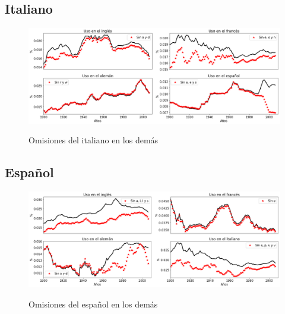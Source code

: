 \newpage
\subsection{Italiano}

\begin{figure}[h!]
	\centering
	\includegraphics[scale=.375]{Cap_5/OM_IT.png}
	\label{fig.OM_IT}
	\caption{Omisiones del italiano en los demás}
\end{figure}


\newpage
\subsection{Español}

\begin{figure}[h!]
	\centering
	\includegraphics[scale=.375]{Cap_5/OM_SP.png}
	\label{fig.OM_SP}
	\caption{Omisiones del español en los demás}
\end{figure}
